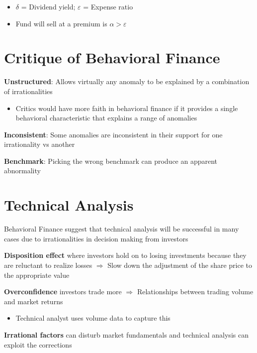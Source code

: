 \documentclass[]{book}
\providecommand{\tightlist}{%
  \setlength{\itemsep}{0pt}\setlength{\parskip}{0pt}}
\theoremstyle{definition}
\theoremstyle{definition}
\theoremstyle{remark}
\begin{document}
\begin{itemize}
\item
  \(\delta\) = Dividend yield; \(\varepsilon\) = Expense ratio
\item
  Fund will sell at a premium is \(\alpha > \varepsilon\)
\end{itemize}

\section{Critique of Behavioral
Finance}\label{critique-of-behavioral-finance}

\textbf{Unstructured}: Allows virtually any anomaly to be explained by a
combination of irrationalities

\begin{itemize}
\tightlist
\item
  Critics would have more faith in behavioral finance if it provides a
  single behavioral characteristic that explains a range of anomalies
\end{itemize}

\textbf{Inconsistent}: Some anomalies are inconsistent in their support
for one irrationality vs another

\textbf{Benchmark}: Picking the wrong benchmark can produce an apparent
abnormality

\section{Technical Analysis}\label{technical-analysis-1}

Behavioral Finance suggest that technical analysis will be successful in
many cases due to irrationalities in decision making from investors

\textbf{Disposition effect} where investors hold on to losing
investments because they are reluctant to realize losses \(\Rightarrow\)
Slow down the adjustment of the share price to the appropriate value

\textbf{Overconfidence} investors trade more \(\Rightarrow\)
Relationships between trading volume and market returns

\begin{itemize}
\tightlist
\item
  Technical analyst uses volume data to capture this
\end{itemize}

\textbf{Irrational factors} can disturb market fundamentals and
technical analysis can exploit the corrections
\end{document}
